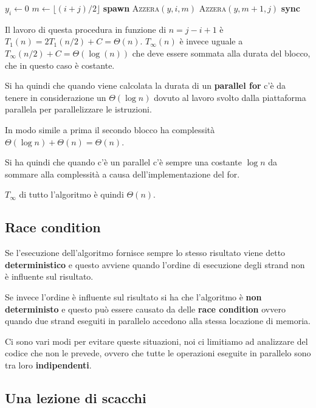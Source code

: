 \begin{breakablealgorithm}
\begin{algorithmic}[1]
    \State $y_i \gets 0$
\Else 
    \State $m \gets \lfloor (i+j)/2\rfloor$
    \State \textbf{spawn} \textsc{Azzera}$(y,i,m)$
    \State \textsc{Azzera}$(y,m+1,j)$
    \State \textbf{sync}
\EndIf
\EndFunction
\end{algorithmic}
\end{breakablealgorithm}

Il lavoro di questa procedura in funzione di $n = j-i+1$ è $T_1(n)= 2T_1(n/2)+ C = \Theta(n)$. $T_\infty(n)$ è invece uguale a $T_\infty(n/2)+C = \Theta(\log(n))$ che deve essere sommata alla durata del blocco, che in questo caso è costante.

Si ha quindi che quando viene calcolata la durata di un \textbf{parallel for} c'è da tenere in considerazione un $\Theta(\log n )$ dovuto al lavoro svolto dalla piattaforma parallela per parallelizzare le istruzioni.

In modo simile a prima il secondo blocco ha complessità $\Theta(\log n ) +\Theta(n) = \Theta(n)$.

Si ha quindi che quando c'è un parallel c'è sempre una costante $\log n$ da sommare alla complessità a causa dell'implementazione del for.

$T_\infty$ di tutto l'algoritmo è quindi $\Theta(n)$.

\subsection{Race condition}\label{race-condition}

Se l'esecuzione dell'algoritmo fornisce sempre lo stesso risultato viene detto \textbf{deterministico} e questo avviene quando l'ordine di esecuzione degli strand non è influente sul risultato.

Se invece l'ordine è influente sul risultato si ha che l'algoritmo è \textbf{non deterministo} e questo può essere causato da delle \textbf{race condition} ovvero quando due strand eseguiti in parallelo accedono alla stessa locazione di memoria.

Ci sono vari modi per evitare queste situazioni, noi ci limitiamo ad analizzare del codice che non le prevede, ovvero che tutte le operazioni eseguite in parallelo sono tra loro \textbf{indipendenti}.

\subsection{Una lezione di scacchi}\label{una-lezione-di-scacchi}

